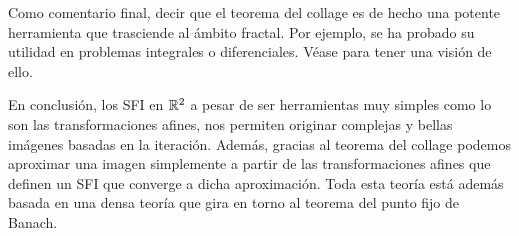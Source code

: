 Como comentario final, decir que el teorema del collage es de hecho una potente herramienta que trasciende al ámbito fractal. Por ejemplo, se ha probado su utilidad en problemas integrales o diferenciales. Véase \cite{LaTorre} para tener una visión de ello.

En conclusión, los SFI en $\mathbb{R}^2$ a pesar de ser herramientas muy simples como lo son las transformaciones afines, nos permiten originar complejas y bellas imágenes basadas en la iteración. Además, gracias al teorema del collage podemos aproximar una imagen simplemente a partir de las transformaciones afines que definen un SFI que converge a dicha aproximación. Toda esta teoría está además basada en una densa teoría que gira en torno al teorema del punto fijo de Banach.

